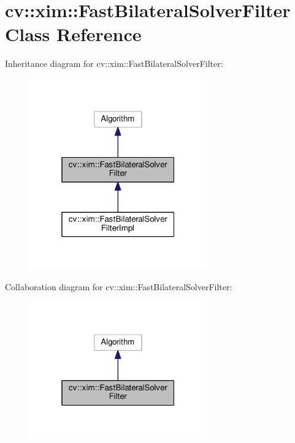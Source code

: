 \hypertarget{classcv_1_1xim_1_1FastBilateralSolverFilter}{}\section{cv\+:\+:xim\+:\+:Fast\+Bilateral\+Solver\+Filter Class Reference}
\label{classcv_1_1xim_1_1FastBilateralSolverFilter}


Inheritance diagram for cv\+:\+:xim\+:\+:Fast\+Bilateral\+Solver\+Filter\+:
\nopagebreak
\begin{figure}[H]
\begin{center}
\leavevmode
\includegraphics[width=217pt]{classcv_1_1xim_1_1FastBilateralSolverFilter__inherit__graph}
\end{center}
\end{figure}


Collaboration diagram for cv\+:\+:xim\+:\+:Fast\+Bilateral\+Solver\+Filter\+:
\nopagebreak
\begin{figure}[H]
\begin{center}
\leavevmode
\includegraphics[width=217pt]{classcv_1_1xim_1_1FastBilateralSolverFilter__coll__graph}
\end{center}
\end{figure}
